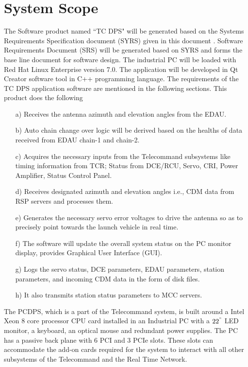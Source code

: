 \section{System Scope}
The Software product named ``TC DPS" will be generated based on the Systems Requirements Specification document (SYRS) given in this document \cite{SYRSLBDPS}. Software Requirements Document (SRS) \cite{SRSLBDPS} will be generated based on SYRS and forms the base line document for software design. The industrial PC will be loaded with Red Hat Linux Enterprise version 7.0. The application will be developed in Qt Creator software tool in C++ programming language. The requirements of the TC DPS application software are mentioned in the following sections. This product does the following 

\begin{enumerate}
	\item [a)] Receives the antenna azimuth and elevation angles from the EDAU.
	\item [b)] Auto chain change over logic will be derived based on the healths of data received from EDAU chain-1 and chain-2.  
	\item [c)] Acquires the necessary inputs from the Telecommand subsystems like timing information from TCR; Status from DCE/RCU, Servo, CRI, Power Amplifier, Status Control Panel.
	\item [d)] Receives designated azimuth and elevation angles i.e., CDM data from RSP servers and processes them.
	\item [e)] Generates the necessary servo error voltages to drive the antenna so as to precisely point towards the launch vehicle in real time.
	\item [f)] The software will update the overall system status on the PC monitor display, provides Graphical User Interface (GUI).
	\item [g)] Logs the servo status, DCE parameters, EDAU parameters, station parameters, and incoming CDM data in the form of disk files.
	\item [h)] It also transmits station status parameters to MCC servers.
	
\end{enumerate}

The PCDPS, which is a part of the Telecommand system, is built around a Intel Xeon 8 core processor CPU card installed in an Industrial PC with a ${22}^{"}$ LED monitor, a keyboard, an optical mouse and redundant power supplies. The PC has a passive back plane with 6 PCI and 3 PCIe slots. These slots can accommodate the add-on cards required for the system to interact with all other subsystems of the Telecommand and the Real Time Network.